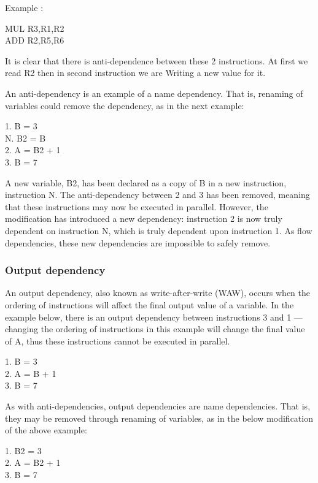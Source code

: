 Example :
\begin{center}
    MUL R3,R1,R2 \\
    ADD R2,R5,R6
    \end{center}
    It is clear that there is anti-dependence between these 2 instructions. At first we read R2 then in second instruction we are Writing a new value for it.

    An anti-dependency is an example of a name dependency. That is, renaming of variables could remove the dependency, as in the next example:
    \begin{center}
        1. B = 3 \\ 
        N. B2 = B \\
        2. A = B2 + 1 \\
        3. B = 7
        \end{center}
    A new variable, B2, has been declared as a copy of B in a new instruction, instruction N. The anti-dependency between 2 and 3 has been removed, meaning that these instructions may now be executed in parallel. However, the modification has introduced a new dependency: instruction 2 is now truly dependent on instruction N, which is truly dependent upon instruction 1. As flow dependencies, these new dependencies are impossible to safely remove. 

\subsubsection{Output dependency}

An output dependency, also known as write-after-write (WAW), occurs when the ordering of instructions will affect the final output value of a variable. In the example below, there is an output dependency between instructions 3 and 1 — changing the ordering of instructions in this example will change the final value of A, thus these instructions cannot be executed in parallel.

\begin{center}
    1. B = 3 \\ 
    2. A = B + 1 \\
    3. B = 7
    \end{center}
As with anti-dependencies, output dependencies are name dependencies. That is, they may be removed through renaming of variables, as in the below modification of the above example:
\begin{center}
    1. B2 = 3 \\
    2. A = B2 + 1 \\
    3. B = 7
    \end{center}


